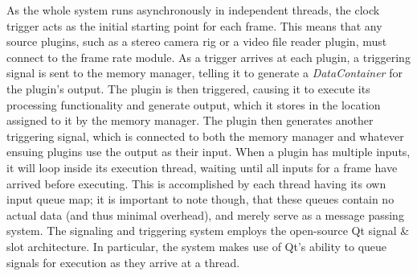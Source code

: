 As the whole system runs asynchronously in independent threads, the clock trigger acts as the initial starting point for each frame. This means that any source plugins, such as a stereo camera rig or a video file reader plugin, must connect to the frame rate module. As a trigger arrives at each plugin, a triggering signal is sent to the memory manager, telling it to generate a \emph{DataContainer} for the plugin's output. The plugin is then triggered, causing it to execute its processing functionality and generate output, which it stores in the location assigned to it by the memory manager. The plugin then generates another triggering signal, which is connected to both the memory manager and whatever ensuing plugins use the output as their input. When a plugin has multiple inputs, it will loop inside its execution thread, waiting until all inputs for a frame have arrived before executing. This is accomplished by each thread having its own input queue map; it is important to note though, that these queues 
contain no actual data (and thus minimal overhead), and merely serve as a message passing system. The signaling and triggering system employs the open-source Qt signal \& slot architecture. In particular, the system makes use of Qt's ability to queue signals for execution as they arrive at a thread. 

